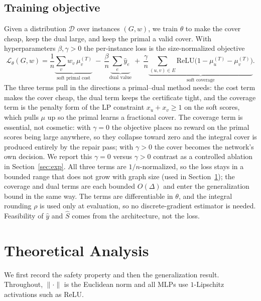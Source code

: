 \documentclass[11pt]{article}
\theoremstyle{plain}
\theoremstyle{definition}
\theoremstyle{remark}
\newcommand{\Dcal}{\mathcal{D}}
\begin{document}
\subsection{Training objective}
Given a distribution $\Dcal$ over instances $(G,w)$, we train $\theta$ to make
the cover cheap, keep the dual large, and keep the primal a valid cover. With
hyperparameters $\beta,\gamma>0$ the per-instance loss is the size-normalized
objective
\begin{equation}
\mathcal{L}_\theta(G,w)=\frac1n\underbrace{\sum_v w_v\,\mu_v^{(T)}}_{\text{soft primal cost}}
   \ -\ \frac{\beta}{n}\underbrace{\sum_e \hat y_e}_{\text{dual value}}
   \ +\ \frac{\gamma}{n}\underbrace{\sum_{(u,v)\in E}\mathrm{ReLU}\!\bigl(1-\mu_u^{(T)}-\mu_v^{(T)}\bigr)}_{\text{soft coverage}}. \label{eq:loss}
\end{equation}
The three terms pull in the directions a primal--dual method needs: the cost term
makes the cover cheap, the dual term keeps the certificate tight, and the
coverage term is the penalty form of the LP constraint $x_u+x_v\ge1$ on the soft
scores, which pulls $\mu$ up so the primal learns a fractional cover. The
coverage term is essential, not cosmetic: with $\gamma=0$ the objective places no
reward on the primal scores being large anywhere, so they collapse toward zero
and the integral cover is produced entirely by the repair pass; with $\gamma>0$
the cover becomes the network's own decision. We report this $\gamma=0$ versus
$\gamma>0$ contrast as a controlled ablation in Section~\ref{sec:exp}. All three
terms are $1/n$-normalized, so the loss stays in a bounded range that does not
grow with graph size (used in Section~\ref{sec:theory}); the coverage and dual
terms are each bounded $O(\Delta)$ and enter the generalization bound in the same
way. The terms are differentiable in $\theta$, and the integral rounding $\rho$
is used only at evaluation, so no discrete-gradient estimator is needed.
Feasibility of $\hat y$ and $\hat S$ comes from the architecture, not the loss.

\section{Theoretical Analysis}\label{sec:theory}
We first record the safety property and then the generalization result.
Throughout, $\|\cdot\|$ is the Euclidean norm and all MLPs use $1$-Lipschitz
activations such as ReLU.
\end{document}
